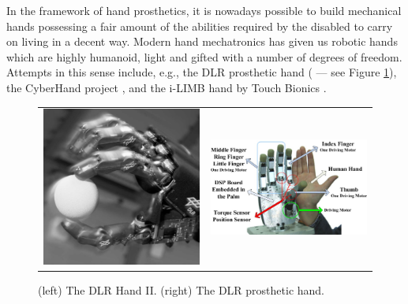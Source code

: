 In the framework of hand prosthetics, it is nowadays possible to build
mechanical hands possessing a fair amount of the abilities required by
the disabled to carry on living in a decent way. Modern hand
mechatronics has given us robotic hands which are highly humanoid,
light and gifted with a number of degrees of freedom. Attempts in this
sense include, e.g., the DLR prosthetic hand (\cite{Hua2006} --- see
Figure \ref{fig:DLRHandII}), the CyberHand project \cite{cyberhand},
and the i-LIMB hand by Touch Bionics \cite{ilimb}.

\begin{figure}
  \begin{tabular}{cc}
    \includegraphics[height=0.12\textheight]{figs/DLRHand-Ball-comp.eps} &
    \includegraphics[height=0.12\textheight]{figs/DLR-Prothese.eps}
  \end{tabular}
  \caption{(left) The DLR Hand II. (right) The DLR prosthetic hand.}
  \label{fig:DLRHandII}
\end{figure}


